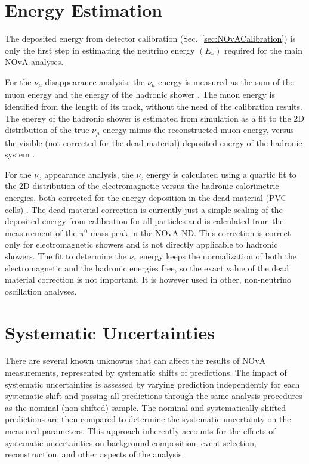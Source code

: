 \section{Energy Estimation}\label{sec:NOvAEnergyEstimation}
The deposited energy from detector calibration (Sec.~\ref{sec:NOvACalibration}) is only the first step in estimating the neutrino energy $\left(E_\nu\right)$ required for the main \gls{NOvA} analyses.

For the $\nu_\mu$ disappearance analysis, the $\nu_\mu$ energy is measured as the sum of the muon energy and the energy of the hadronic shower \cite{NOvAResults2021.pdf}. The muon energy is identified from the length of its track, without the need of the calibration results. The energy of the hadronic shower is estimated from simulation as a fit to the 2D distribution of the true $\nu_\mu$ energy minus the reconstructed muon energy, versus the visible (not corrected for the dead material) deposited energy of the hadronic system \cite{PsihasNOvAThesis_ProngCVN.pdf}.

For the $\nu_e$ appearance analysis, the $\nu_e$ energy is calculated using a quartic fit to the 2D distribution of the electromagnetic versus the hadronic calorimetric energies, both corrected for the energy deposition in the dead material (\gls{PVC} cells) \cite{PsihasNOvAThesis_ProngCVN.pdf}. The dead material correction is currently just a simple scaling of the deposited energy from calibration for all particles and is calculated from the measurement of the $\pi^0$ mass peak in the \gls{NOvA} \gls{ND}. This correction is correct only for electromagnetic showers and is not directly applicable to hadronic showers. The fit to determine the $\nu_e$ energy keeps the normalization of both the electromagnetic and the hadronic energies free, so the exact value of the dead material correction is not important. It is however used in other, non-neutrino oscillation analyses.

\section{Systematic Uncertainties}\label{sec:NOvASystematics}
There are several known unknowns that can affect the results of \gls{NOvA} measurements, represented by systematic shifts of predictions. The impact of systematic uncertainties is assessed by varying prediction independently for each systematic shift and passing all predictions through the same analysis procedures as the nominal (non-shifted) sample. The nominal and systematically shifted predictions are then compared to determine the systematic uncertainty on the measured parameters. This approach inherently accounts for the effects of systematic uncertainties on background composition, event selection, reconstruction, and other aspects of the analysis.

